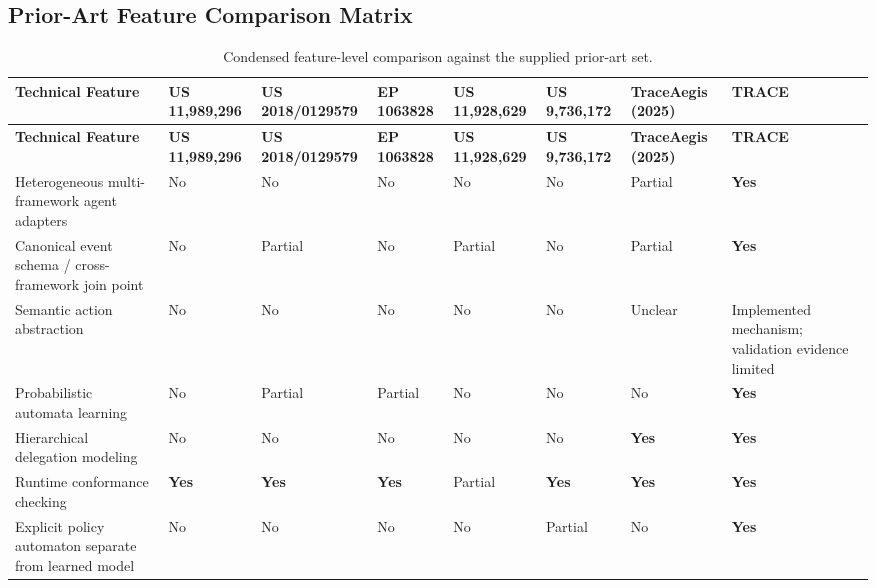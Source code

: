 \documentclass[11pt,a4paper]{article}
\newcommand{\yes}{\textcolor{yesgreen}{\textbf{Yes}}}
\newcommand{\no}{\textcolor{nored}{No}}
\newcommand{\partialmark}{\textcolor{partialorange}{Partial}}
\begin{document}
\subsection{Prior-Art Feature Comparison Matrix}

\begin{landscape}
\tiny
\begin{longtable}{L{4.1cm} C{1.9cm} C{1.9cm} C{1.9cm} C{1.9cm} C{1.9cm} C{2.1cm} C{1.6cm}}
\caption{Condensed feature-level comparison against the supplied prior-art set.}
\label{tab:matrix}\\
\toprule
\textbf{Technical Feature} &
\textbf{US 11,989,296} &
\textbf{US 2018/0129579} &
\textbf{EP 1063828} &
\textbf{US 11,928,629} &
\textbf{US 9,736,172} &
\textbf{TraceAegis (2025)} &
\textbf{TRACE} \\
\midrule
\endfirsthead

\toprule
\textbf{Technical Feature} &
\textbf{US 11,989,296} &
\textbf{US 2018/0129579} &
\textbf{EP 1063828} &
\textbf{US 11,928,629} &
\textbf{US 9,736,172} &
\textbf{TraceAegis (2025)} &
\textbf{TRACE} \\
\midrule
\endhead

\bottomrule
\endfoot

\bottomrule
\endlastfoot

Heterogeneous multi-framework agent adapters &
\no & \no & \no & \no & \no & \partialmark & \yes \\

Canonical event schema / cross-framework join point &
\no & \partialmark & \no & \partialmark & \no & \partialmark & \yes \\

Semantic action abstraction &
\no & \no & \no & \no & \no & Unclear & Implemented mechanism; validation evidence limited \\

Probabilistic automata learning &
\no & \partialmark & \partialmark & \no & \no & \no & \yes \\

Hierarchical delegation modeling &
\no & \no & \no & \no & \no & \yes & \yes \\

Runtime conformance checking &
\yes & \yes & \yes & \partialmark & \yes & \yes & \yes \\

Explicit policy automaton separate from learned model &
\no & \no & \no & \no & \partialmark & \no & \yes \\


\end{longtable}
\end{landscape}
\end{document}
